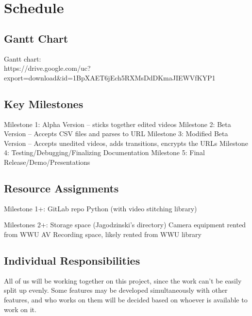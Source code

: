 \section{Schedule}

\subsection{Gantt Chart}

Gantt chart:\\
https://drive.google.com/uc?export=download&id=1BpXAET6jEch5RXMsDdDKmaJIEWVfKYP1


\subsection{Key Milestones}

Milestone 1: Alpha Version – sticks together edited videos
Milestone 2: Beta Version – Accepts CSV files and parses to URL
Milestone 3: Modified Beta Version – Accepts unedited videos, adds transitions, encrypts the URLs
Milestone 4: Testing/Debugging/Finalizing Documentation
Milestone 5: Final Release/Demo/Presentations

\subsection{Resource Assignments}

Milestone 1+:
GitLab repo
Python (with video stitching library)

Milestones 2+:
Storage space (Jagodzinski's directory)
Camera equipment rented from WWU AV
Recording space, likely rented from WWU library


\subsection{Individual Responsibilities}

All of us will be working together on this project, since the work can't be easily split up evenly.
Some features may be developed simultaneously with other features, and who works on them will be
decided based on whoever is available to work on it.
